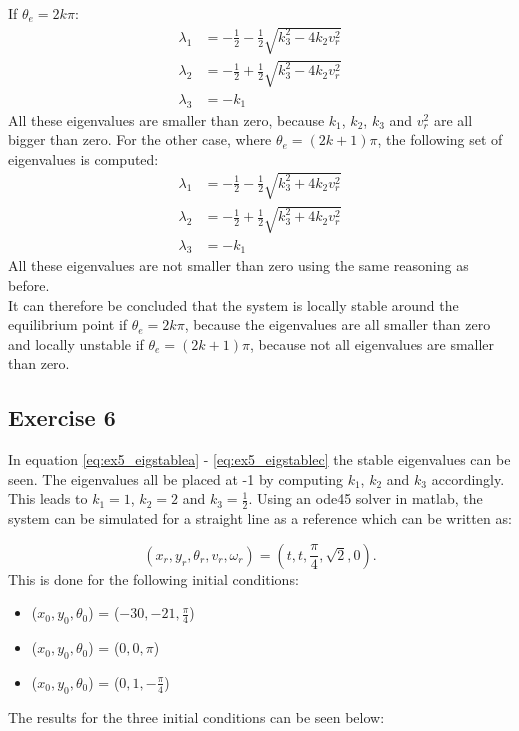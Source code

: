 If $\theta_e = 2 k \pi$:
\begin{align}
    \lambda_1 &= -\frac{1}{2} - \frac{1}{2} \sqrt{k_3^2 - 4 k_2 v_r^2} \label{eq:ex5_eigstablea} \\
    \lambda_2 &= -\frac{1}{2} + \frac{1}{2} \sqrt{k_3^2 - 4 k_2 v_r^2} \label{eq:ex5_eigstableb} \\
    \lambda_3 &= - k_1 \label{eq:ex5_eigstablec}
\end{align}
All these eigenvalues are smaller than zero, because $k_1$, $k_2$, $k_3$ and $v_r^2$ are all bigger than zero. For the other case, where $\theta_e = (2k + 1)\pi$, the following set of eigenvalues is computed:
\begin{align}
    \lambda_1 &= -\frac{1}{2} - \frac{1}{2} \sqrt{k_3^2 + 4 k_2 v_r^2} \\
    \lambda_2 &= -\frac{1}{2} + \frac{1}{2} \sqrt{k_3^2 + 4 k_2 v_r^2} \\
    \lambda_3 &= - k_1    
\end{align}
All these eigenvalues are not smaller than zero using the same reasoning as before. \\
It can therefore be concluded that the system is locally stable around the equilibrium point if $\theta_e = 2 k \pi$, because the eigenvalues are all smaller than zero and locally unstable if $\theta_e = (2k + 1) \pi$, because not all eigenvalues are smaller than zero.
\subsection{Exercise 6}
In equation \eqref{eq:ex5_eigstablea} - \eqref{eq:ex5_eigstablec} the stable eigenvalues can be seen. The eigenvalues all be placed at -1 by computing $k_1$, $k_2$ and $k_3$ accordingly. This leads to $k_1 = 1$, $k_2 = 2$ and $k_3 = \frac{1}{2}$. Using an ode45 solver in matlab, the system can be simulated for a straight line as a reference which can be written as:

\begin{equation}
    (x_r, y_r, \theta_r, v_r, \omega_r) = (t, t, \frac{\pi}{4}, \sqrt{2}, 0).
\end{equation}
This is done for the following initial conditions:
\begin{itemize}
    \item ($x_0, y_0, \theta_0$) = ($-30, -21, \frac{\pi}{4}$)
    \item ($x_0, y_0, \theta_0$) = ($0, 0, \pi$)
    \item ($x_0, y_0, \theta_0$) = ($0, 1, -\frac{\pi}{4}$)
\end{itemize}
The results for the three initial conditions can be seen below:
